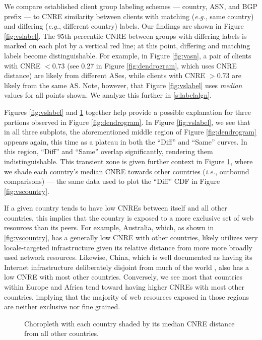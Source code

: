 We compare established client group labeling schemes  ---
country, ASN, and BGP prefix --- to CNRE similarity between clients with
matching (\emph{e.g.}, same country) and differing (\emph{e.g.}, different
country) labels. Our findings are shown in Figure \ref{fig:vslabel}. The 95th percentile CNRE between groups with differing labels
is marked on each plot by a vertical red line; at this point,
differing and matching labels become distinguishable. For example, in Figure
\ref{fig:vasn}, a pair of clients with CNRE $< 0.73$ (see 0.27 in
Figure \ref{fig:dendrogram}, which uses CNRE distance) are likely from different
ASes, while clients with CNRE $> 0.73$ are likely from the same AS. Note, however, that
Figure \ref{fig:vslabel} uses \emph{median} values for all points shown. We analyze
this further in \ref{s:labelalgn}. 


Figures \ref{fig:vslabel} and \ref{fig:cnredist} together help provide a possible
explanation for three partions observed in Figure \ref{fig:dendrogram}. In
Figure \ref{fig:vslabel}, we see that in all three subplots, the aforementioned
middle region of Figure \ref{fig:dendrogram} appears again, this time as a
plateau in both the ``Diff'' and ``Same'' curves. In this region, ``Diff'' and
``Same'' overlap significantly, rendering them indistinguishable. This transient
zone is given further context in Figure \ref{fig:cnredist}, where we shade each
country's median CNRE towards other countries (\emph{i.e.}, outbound
comparisons) --- the same data used to plot the
``Diff'' CDF in Figure \ref{fig:vscountry}. 

If a given country tends to have low CNREs between itself and all other
countries, this implies that the country is exposed to a more exclusive set of
web resources than its peers. For example, Australia, which, as shown in
\ref{fig:vscountry}, has a generally low CNRE with other countries, likely
utilizes very locale-targeted infrastructure given its relative distance from
more more broadly used network resources. Likewise, China, which is well
documented as having its Internet infrastructure deliberately disjoint from much
of the world \cite{Anderson:2012}, also has a low CNRE with most other
countries. Conversely, we see most that countries within Europe and Africa tend
toward having higher CNREs with most other countries, implying that the majority
of web resources exposed in those regions are neither exclusive nor fine grained. 

\begin{figure}


    \caption{Choropleth with each country shaded by its median CNRE distance
    from all other countries.}
    \label{fig:cnredist}

\end{figure}


